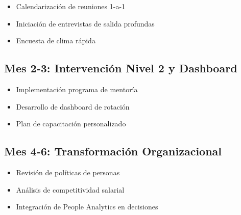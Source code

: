 \documentclass[11pt,a4paper,twoside]{article}
\begin{document}
\begin{itemize}
    \item Calendarización de reuniones 1-a-1
    \item Iniciación de entrevistas de salida profundas
    \item Encuesta de clima rápida
\end{itemize}

\subsection{Mes 2-3: Intervención Nivel 2 y Dashboard}

\begin{itemize}
    \item Implementación programa de mentoría
    \item Desarrollo de dashboard de rotación
    \item Plan de capacitación personalizado
\end{itemize}

\subsection{Mes 4-6: Transformación Organizacional}

\begin{itemize}
    \item Revisión de políticas de personas
    \item Análisis de competitividad salarial
    \item Integración de People Analytics en decisiones
\end{itemize}

\newpage
\end{document}
